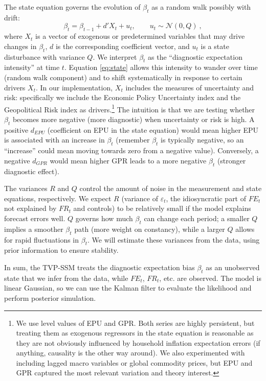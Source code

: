 \documentclass[12pt]{article}
\begin{document}
The state equation governs the evolution of $\beta_t$ as a random walk possibly with drift:
\begin{equation}\label{eq:state}
    \beta_t = \beta_{t-1} + d' X_t + u_t, \qquad u_t \sim \mathcal{N}(0, Q)~,
\end{equation}
where $X_t$ is a vector of exogenous or predetermined variables that may drive changes in $\beta_t$, $d$ is the corresponding coefficient vector, and $u_t$ is a state disturbance with variance $Q$. We interpret $\beta_t$ as the “diagnostic expectation intensity” at time $t$. Equation \eqref{eq:state} allows this intensity to wander over time (random walk component) and to shift systematically in response to certain drivers $X_t$. In our implementation, $X_t$ includes the measures of uncertainty and risk: specifically we include the Economic Policy Uncertainty index and the Geopolitical Risk index as drivers.\footnote{We use level values of EPU and GPR. Both series are highly persistent, but treating them as exogenous regressors in the state equation is reasonable as they are not obviously influenced by household inflation expectation errors (if anything, causality is the other way around). We also experimented with including lagged macro variables or global commodity prices, but EPU and GPR captured the most relevant variation and theory interest.} The intuition is that we are testing whether $\beta_t$ becomes more negative (more diagnostic) when uncertainty or risk is high. A positive $d_{EPU}$ (coefficient on EPU in the state equation) would mean higher EPU is associated with an increase in $\beta_t$ (remember $\beta_t$ is typically negative, so an “increase” could mean moving towards zero from a negative value). Conversely, a negative $d_{GPR}$ would mean higher GPR leads to a more negative $\beta_t$ (stronger diagnostic effect).

The variances $R$ and $Q$ control the amount of noise in the measurement and state equations, respectively. We expect $R$ (variance of $\varepsilon_t$, the idiosyncratic part of $FE_t$ not explained by $FR_t$ and controls) to be relatively small if the model explains forecast errors well. $Q$ governs how much $\beta_t$ can change each period; a smaller $Q$ implies a smoother $\beta_t$ path (more weight on constancy), while a larger $Q$ allows for rapid fluctuations in $\beta_t$. We will estimate these variances from the data, using prior information to ensure stability.

In sum, the TVP-SSM treats the diagnostic expectation bias $\beta_t$ as an unobserved state that we infer from the data, while $FE_t$, $FR_t$, etc. are observed. The model is linear Gaussian, so we can use the Kalman filter to evaluate the likelihood and perform posterior simulation.
\end{document}
